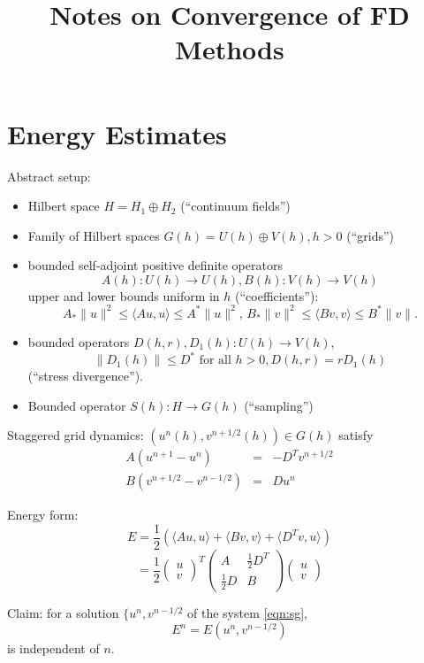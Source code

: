 \title{Notes on Convergence of FD Methods}
\maketitle
 
\section{Energy Estimates}
Abstract setup: 
\begin{itemize} 
\item Hilbert space $H=H_1 \oplus H_2$ (``continuum fields'')
\item Family of Hilbert spaces $G(h) =U(h) \oplus V(h), h>0$ (``grids'')
\item bounded self-adjoint positive definite operators 
\[
A(h): U(h) \rightarrow U(h), B(h): V(h) \rightarrow V(h)
\]
upper and lower bounds uniform in $h$ (``coefficients''):
\[
A_*\|u\|^2 \le \langle Au,u \rangle \le A^*\|u\|^2, \, B_*\|v\|^2 \le
\langle B v, v\rangle \le B^*\|v\|.
\]
\item bounded operators $D(h,r), D_1(h):U(h) \rightarrow V(h)$,
\[
\|D_1(h)\| \le D^* \mbox{ for all }h>0, D(h,r) = rD_1(h)
\]
(``stress divergence'').
\item Bounded operator $S(h):H \rightarrow G(h)$ (``sampling'')
\end{itemize}

Staggered grid dynamics: $(u^n(h),v^{n+1/2}(h)) \in G(h)$ satisfy 
\begin{eqnarray}
\label{eqn:sg}
A(u^{n+1} - u^n) & = & -D^T v^{n+1/2} \nonumber\\
B(v^{n+1/2}-v^{n-1/2}) & = & D u^n
\end{eqnarray}

Energy form:
\[
E = \frac{1}{2}(\langle Au,u\rangle + \langle Bv,v\rangle + \langle D^Tv,u\rangle ) 
\]
\[
= \frac{1}{2} \left(
\begin{array}{c}
u\\
v 
\end{array}
\right)^T
\left(
\begin{array}{cc}
A & \frac{1}{2}D^T\\
\frac{1}{2}D & B
\end{array}
\right)
\left(
\begin{array}{c}
u\\
v 
\end{array}
\right)
\]

\noindent Claim: for a solution $\{u^n,v^{n-1/2}$ of the system \ref{eqn:sg},
\[
E^n = E(u^n,v^{n-1/2})
\]
is independent of $n$.

